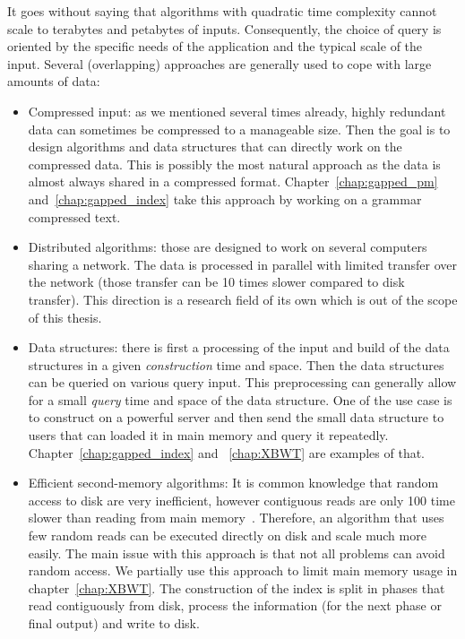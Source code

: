 It goes without saying that algorithms with quadratic time complexity cannot scale to terabytes and petabytes of inputs. Consequently, the choice of query is oriented by the specific needs of the application and the typical scale of the input.
Several (overlapping) approaches are generally used to cope with large amounts of data:
\begin{itemize}
\item Compressed input: as we mentioned several times already, highly redundant data can sometimes be compressed to a manageable size. Then the goal is to design algorithms and data structures that can directly work on the compressed data. This is possibly the most natural approach as the data is almost always shared in a compressed format. Chapter~\ref{chap:gapped_pm} and~\ref{chap:gapped_index} take this approach by working on a grammar compressed text.
\item Distributed algorithms: those are designed to work on several computers sharing a network. The data is processed in parallel with limited transfer over the network (those transfer can be 10 times slower compared to disk transfer). This direction is a research field of its own which is out of the scope of this thesis.
\item Data structures: there is first a processing of the input and build of the data structures in a given \emph{construction} time and space. Then the data structures can be queried on various query input. This preprocessing can generally allow for a small \emph{query} time and space of the data structure. One of the use case is to construct on a powerful server and then send the small data structure to users that can loaded it in main memory and query it repeatedly. Chapter~\ref{chap:gapped_index} and ~\ref{chap:XBWT} are examples of that.
\item Efficient second-memory algorithms: It is  common knowledge that random access to disk are very inefficient, however contiguous reads are only 100 time slower than reading from main memory~\cite{navarro2016compact}. Therefore, an algorithm that uses few random reads can be executed directly on disk and scale much more easily. The main issue with this approach is that not all problems can avoid random access. We partially use this approach to limit main memory usage in chapter~\ref{chap:XBWT}. The construction of the index is split in phases that read contiguously from disk, process the information (for the next phase or final output) and write to disk.

\end{itemize}
